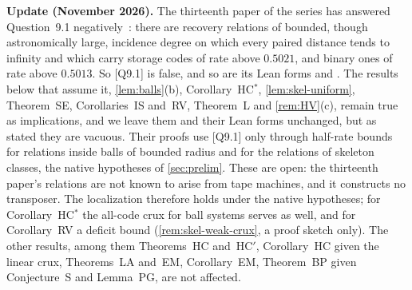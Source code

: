\textbf{Update (November 2026).} The thirteenth paper of the series has answered Question~9.1
negatively~\cite[Theorem~A and Corollary~A$'$]{StorageCodes2026}: there are recovery relations of bounded, though
astronomically large, incidence degree on which every paired distance tends to infinity and which carry storage codes of
rate above $0.5021$, and binary ones of rate above $0.5013$. So [Q9.1] is false, and so are its Lean forms
 and . The results below that assume it, \cref{lem:balls}(b),
Corollary~HC$^*$, \cref{lem:skel-uniform}, Theorem~SE, Corollaries~IS and~RV, Theorem~L and \cref{rem:HV}(c), remain true
as implications, and we leave them and their Lean forms unchanged, but as stated they are vacuous. Their proofs use
[Q9.1] only through half-rate bounds for relations inside balls of bounded radius and for the relations of skeleton
classes, the native hypotheses of \cref{sec:prelim}. These are open: the thirteenth paper's relations are not known to
arise from tape machines, and it constructs no transposer. The localization therefore holds under the native
hypotheses; for Corollary~HC$^*$ the all-code crux for ball systems serves as well, and for Corollary~RV a deficit bound
(\cref{rem:skel-weak-crux}, a proof sketch only). The other results, among them Theorems~HC and~HC$'$, Corollary~HC given
the linear crux, Theorems~LA and~EM, Corollary~EM, Theorem~BP given Conjecture~S and Lemma~PG, are not affected.

